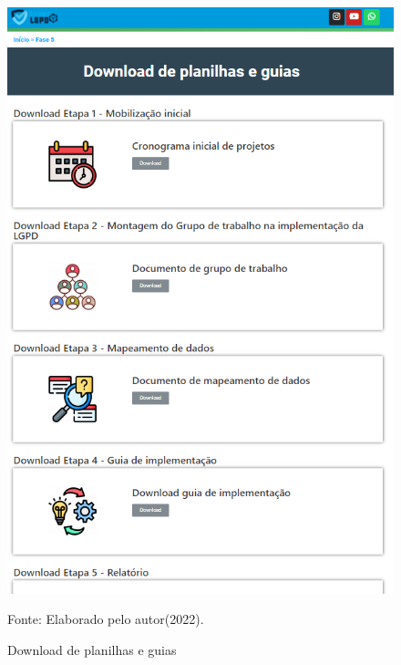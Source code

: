 \documentclass[
	12pt,				%
	openright,			%
	oneside,			%
	a4paper,			%
	english,			%
	french,				%
	spanish,			%
	brazil,				%
	]{abntex2}
\begin{document}
\begin{figure}[ht]
    \centering
    \caption{Download de planilhas e guias}
    \includegraphics[width=5.0in]{Images/download de planilha.png}
    \label{fig: download}
    
    \centering \small Fonte: Elaborado pelo autor(2022).
\end{figure}
\end{document}
